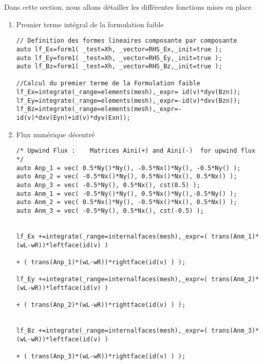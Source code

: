 \documentclass[a4paper,oneside,10pt]{report}
\begin{document}
Dans cette section, nous allons détailler les différentes fonctions mises en place


\begin{enumerate}

\item Premier terme intégral de la formulation faible

\begin{center}
\begin{minipage}{\textwidth}
\begin{lstlisting}[label=code2,caption=Terme integral 1]
// Definition des formes lineaires composante par composante
auto lf_Ex=form1( _test=Xh, _vector=RHS_Ex,_init=true );
auto lf_Ey=form1( _test=Xh, _vector=RHS_Ey,_init=true );
auto lf_Bz=form1( _test=Xh, _vector=RHS_Bz,_init=true );

//Calcul du premier terme de la Formulation faible
lf_Ex=integrate(_range=elements(mesh),_expr= id(v)*dyv(Bzn));
lf_Ey=integrate(_range=elements(mesh),_expr=-id(v)*dxv(Bzn));
lf_Bz=integrate(_range=elements(mesh),_expr=-id(v)*dxv(Eyn)+id(v)*dyv(Exn));
\end{lstlisting}
\end{minipage}
\end{center}


\item Flux numérique décentré

\begin{center}
\begin{minipage}{\textwidth}
\begin{lstlisting}[label=code2,caption=Flux numerique decentre]
/* Upwind Flux : 	Matrices Aini(+) and Aini(-)  for upwind flux 	*/
auto Anp_1 = vec( 0.5*Ny()*Ny(), -0.5*Nx()*Ny(), -0.5*Ny() );
auto Anp_2 = vec( -0.5*Nx()*Ny(), 0.5*Nx()*Nx(), 0.5*Nx() );
auto Anp_3 = vec( -0.5*Ny(), 0.5*Nx(), cst(0.5) );
auto Anm_1 = vec( -0.5*Ny()*Ny(), 0.5*Nx()*Ny(),-0.5*Ny() );
auto Anm_2 = vec( 0.5*Nx()*Ny(), -0.5*Nx()*Nx(), 0.5*Nx() );
auto Anm_3 = vec( -0.5*Ny(), 0.5*Nx(), cst(-0.5) );
	

lf_Ex +=integrate(_range=internalfaces(mesh),_expr=( trans(Anm_1)*(wL-wR))*leftface(id(v) )
																		   + ( trans(Anp_1)*(wL-wR))*rightface(id(v) ) );

lf_Ey +=integrate(_range=internalfaces(mesh),_expr=( trans(Anm_2)*(wL-wR))*leftface(id(v) )
																		   + ( trans(Anp_2)*(wL-wR))*rightface(id(v) ) );


lf_Bz +=integrate(_range=internalfaces(mesh),_expr=( trans(Anm_3)*(wL-wR))*leftface(id(v) )
																		   + ( trans(Anp_3)*(wL-wR))*rightface(id(v) ) );
\end{lstlisting}
\end{minipage}
\end{center}



\end{enumerate}
\end{document}
